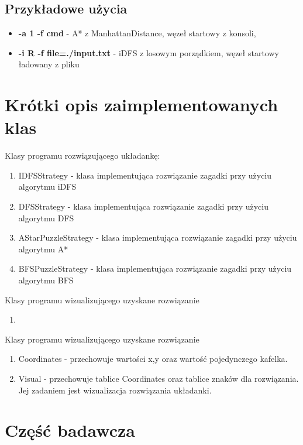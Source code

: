 \documentclass{classrep}
\begin{document}
		\subsection{Przykładowe użycia}
			\begin{itemize}
				\item \textbf{-a 1 -f cmd} - A* z ManhattanDistance, węzeł startowy z konsoli,
				\item \textbf{-i R -f file=./input.txt} - iDFS z losowym porządkiem, węzeł startowy ładowany z pliku
			\end{itemize}
	
	\section{Krótki opis zaimplementowanych klas}
		Klasy programu rozwiązującego układankę:
		\begin{enumerate}
			\item IDFSStrategy - klasa implementująca rozwiązanie zagadki przy użyciu algorytmu iDFS
			\item DFSStrategy - klasa implementująca rozwiązanie zagadki przy użyciu algorytmu DFS
			\item AStarPuzzleStrategy - klasa implementująca rozwiązanie zagadki przy użyciu algorytmu A*
			\item BFSPuzzleStrategy - klasa implementująca rozwiązanie zagadki przy użyciu algorytmu BFS
		\end{enumerate}
		Klasy programu wizualizującego uzyskane rozwiązanie
		\begin{enumerate}
			\item
		\end{enumerate}
		Klasy programu wizualizującego uzyskane rozwiązanie
\begin{enumerate}
\item Coordinates - przechowuje wartości x,y oraz wartość pojedynczego kafelka.
\item Visual -  przechowuje tablice Coordinates oraz tablice znaków dla rozwiązania. Jej zadaniem jest wizualizacja rozwiązania układanki.
\end{enumerate}
		
		\section{Część badawcza}
\end{document}
